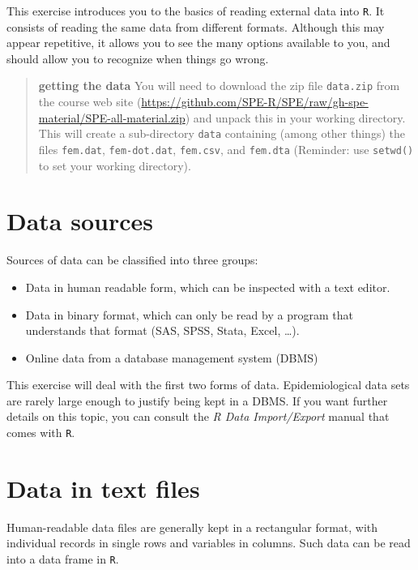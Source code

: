 \documentclass[
]{book}
\providecommand{\tightlist}{%
  \setlength{\itemsep}{0pt}\setlength{\parskip}{0pt}}
\begin{document}
This exercise introduces you to the basics of reading external data
into \texttt{R}. It consists of reading the same data from different
formats. Although this may appear repetitive, it allows you to see
the many options available to you, and should allow you to recognize
when things go wrong.

\begin{quote}
\textbf{getting the data} You will need to download the zip file \texttt{data.zip} from the course web site (\url{https://github.com/SPE-R/SPE/raw/gh-spe-material/SPE-all-material.zip}) and unpack this in your working directory. This will create a sub-directory \texttt{data} containing (among other things) the files \texttt{fem.dat}, \texttt{fem-dot.dat}, \texttt{fem.csv}, and \texttt{fem.dta} (Reminder: use \texttt{setwd()} to set
your working directory).
\end{quote}

\section{Data sources}\label{data-sources}

Sources of data can be classified into three groups:

\begin{itemize}
\tightlist
\item
  Data in human readable form, which can be inspected with a text editor.
\item
  Data in binary format, which can only be read by a program that
  understands that format (SAS, SPSS, Stata, Excel, \ldots).
\item
  Online data from a database management system (DBMS)
\end{itemize}

This exercise will deal with the first two forms of
data. Epidemiological data sets are rarely large enough to justify
being kept in a DBMS. If you want further details on this topic, you
can consult the \emph{R Data Import/Export} manual that comes with
\texttt{R}.

\section{Data in text files}\label{data-in-text-files}

Human-readable data files are generally kept in a rectangular format,
with individual records in single rows and variables in columns. Such
data can be read into a data frame in \texttt{R}.
\end{document}
